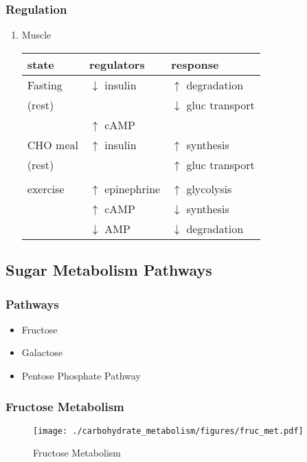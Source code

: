 \documentclass{scrartcl}
\begin{document}
\subsubsection{Regulation}
\label{sec:orgd319a79}
\begin{enumerate}
\item Muscle
\label{sec:orge040272}

\begin{center}
\begin{tabular}{lll}
state & regulators & response\\
\hline
Fasting & \(\downarrow\) insulin & \(\uparrow\) degradation\\
(rest) &  & \(\downarrow\) gluc transport\\
 & \(\uparrow\) cAMP & \\
CHO meal & \(\uparrow\) insulin & \(\uparrow\) synthesis\\
(rest) &  & \(\uparrow\) gluc transport\\
 &  & \\
exercise & \(\uparrow\) epinephrine & \(\uparrow\) glycolysis\\
 & \(\uparrow\) cAMP & \(\downarrow\) synthesis\\
 & \(\downarrow\) AMP & \(\downarrow\) degradation\\
\end{tabular}
\end{center}
\end{enumerate}

\subsection{Sugar Metabolism Pathways}
\label{sec:orge232abc}
\subsubsection{Pathways}
\label{sec:orgf98f19b}
\begin{itemize}
\item Fructose
\item Galactose
\item Pentose Phosphate Pathway
\end{itemize}
\subsubsection{Fructose Metabolism}
\label{sec:org711b33b}

\begin{figure}[htbp]
\centering
\texttt{[image: ./carbohydrate\_metabolism/figures/fruc\_met.pdf]}
\caption{\label{fig:orga83d8b6}
Fructose Metabolism}
\end{figure}
\end{document}
